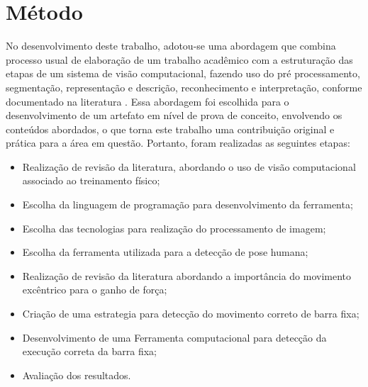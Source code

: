 \section[Método]{Método}\label{sec:Metodo}

No desenvolvimento deste trabalho, adotou-se uma abordagem que combina processo usual de elaboração de um trabalho acadêmico com a estruturação das etapas de um sistema de visão computacional, fazendo uso do pré processamento, segmentação, representação e descrição, reconhecimento e interpretação, conforme documentado na literatura \cite{imagemMonocromatica}. Essa abordagem foi escolhida para o desenvolvimento de um artefato em nível de prova de conceito, envolvendo os conteúdos abordados, o que torna este trabalho uma contribuição original e prática para a área em questão. Portanto, foram realizadas as seguintes etapas:


 \begin{itemize}
   \item Realização de revisão da literatura, abordando o uso de visão computacional associado ao treinamento físico;
   \item Escolha da linguagem de programação para desenvolvimento da ferramenta;
   \item Escolha das tecnologias para realização do processamento de imagem;
   \item Escolha da ferramenta utilizada para a detecção de pose humana;  
   \item Realização de revisão da literatura abordando a importância do movimento excêntrico para o ganho de força;
   \item Criação de uma estrategia para detecção do movimento correto de barra fixa;
   \item Desenvolvimento de uma Ferramenta computacional para detecção da execução correta da barra fixa;
   \item Avaliação dos resultados.
   
 \end{itemize}
